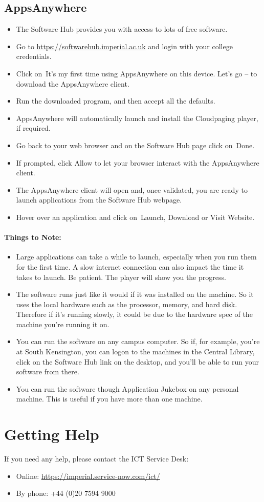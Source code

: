 \documentclass[11pt]{article}
\begin{document}
\subsection{AppsAnywhere} 
\begin{itemize}
  \item The Software Hub provides you with access to lots of free software.
  \item Go to \url{https://softwarehub.imperial.ac.uk} and login with your college credentials.
  \item Click on It’s my first time using AppsAnywhere on this device. Let’s go – to download the AppsAnywhere client.
  \item Run the downloaded program, and then accept all the defaults.
  \item AppsAnywhere will automatically launch and install the Cloudpaging player, if required.
  \item Go back to your web browser and on the Software Hub page click on Done.
  \item If prompted, click Allow to let your browser interact with the AppsAnywhere client.
  \item The AppsAnywhere client will open and, once validated, you are ready to launch applications from the Software Hub webpage.
  \item Hover over an application and click on Launch, Download or Visit Website.
\end{itemize}

\paragraph*{Things to Note:}
\begin{itemize}
  \item Large applications can take a while to launch, especially when you run them for the first time. A slow internet connection can also impact the time it takes to launch. Be patient. The player will show you the progress.
  \item The software runs just like it would if it was installed on the machine. So it uses the local hardware such as the processor, memory, and hard disk. Therefore if it’s running slowly, it could be due to the hardware spec of the machine you’re running it on.
  \item You can run the software on any campus computer. So if, for example, you’re at South Kensington, you can logon to the machines in the Central Library, click on the Software Hub link on the desktop, and you’ll be able to run your software from there.
  \item You can run the software though Application Jukebox on any personal machine. This is useful if you have more than one machine. 
\end{itemize}


\section{Getting Help}

If you need any help, please contact the ICT Service Desk:
\begin{itemize}
  \item Online:     \url{https://imperial.service-now.com/ict/}
  \item By phone:   +44 (0)20 7594 9000
\end{itemize}
\end{document}
